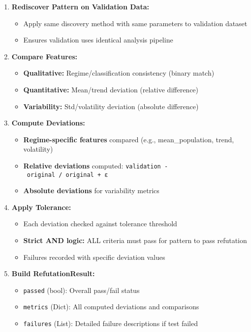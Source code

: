 \documentclass[
]{article}
\providecommand{\tightlist}{%
  \setlength{\itemsep}{0pt}\setlength{\parskip}{0pt}}
\begin{document}
\begin{enumerate}
\def\labelenumi{\arabic{enumi}.}
\tightlist
\item
  \textbf{Rediscover Pattern on Validation Data:}

  \begin{itemize}
  \tightlist
  \item
    Apply same discovery method with same parameters to validation
    dataset
  \item
    Ensures validation uses identical analysis pipeline
  \end{itemize}
\item
  \textbf{Compare Features:}

  \begin{itemize}
  \tightlist
  \item
    \textbf{Qualitative:} Regime/classification consistency (binary
    match)
  \item
    \textbf{Quantitative:} Mean/trend deviation (relative difference)
  \item
    \textbf{Variability:} Std/volatility deviation (absolute difference)
  \end{itemize}
\item
  \textbf{Compute Deviations:}

  \begin{itemize}
  \tightlist
  \item
    \textbf{Regime-specific features} compared (e.g., mean\_population,
    trend, volatility)
  \item
    \textbf{Relative deviations} computed:
    \texttt{\textbar{}validation\ -\ original\textbar{}\ /\ \textbar{}original\ +\ ε\textbar{}}
  \item
    \textbf{Absolute deviations} for variability metrics
  \end{itemize}
\item
  \textbf{Apply Tolerance:}

  \begin{itemize}
  \tightlist
  \item
    Each deviation checked against tolerance threshold
  \item
    \textbf{Strict AND logic:} ALL criteria must pass for pattern to
    pass refutation
  \item
    Failures recorded with specific deviation values
  \end{itemize}
\item
  \textbf{Build RefutationResult:}

  \begin{itemize}
  \tightlist
  \item
    \texttt{passed} (bool): Overall pass/fail status
  \item
    \texttt{metrics} (Dict): All computed deviations and comparisons
  \item
    \texttt{failures} (List): Detailed failure descriptions if test
    failed
  \end{itemize}
\end{enumerate}
\end{document}
